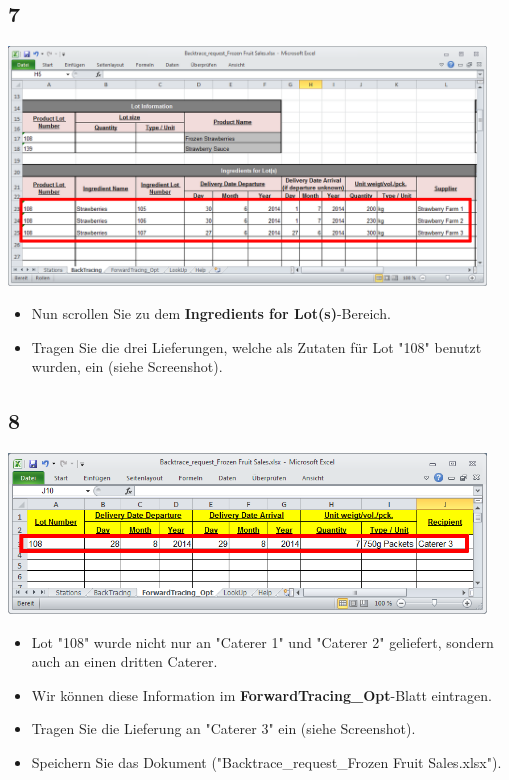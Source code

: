 \documentclass{beamer}
\begin{document}
\subsection{7}
\begin{frame}
	\begin{center}
  		\includegraphics[width=0.95\textwidth]{7.png}
	\end{center}
	\begin{itemize}
		\item Nun scrollen Sie zu dem \textbf{Ingredients for Lot(s)}-Bereich.
		\item Tragen Sie die drei Lieferungen, welche als Zutaten für Lot "108" benutzt wurden, ein (siehe Screenshot).
	\end{itemize}
\end{frame}

\subsection{8}
\begin{frame}
	\begin{center}
  		\includegraphics[width=0.95\textwidth]{8.png}
	\end{center}
	\begin{itemize}
		\item Lot "108" wurde nicht nur an "Caterer 1" und "Caterer 2" geliefert, sondern auch an einen dritten Caterer.
		\item Wir können diese Information im \textbf{ForwardTracing\_Opt}-Blatt eintragen.
		\item Tragen Sie die Lieferung an "Caterer 3" ein (siehe Screenshot).
		\item Speichern Sie das Dokument ("Backtrace\_request\_Frozen Fruit Sales.xlsx").
	\end{itemize}
\end{frame}
\end{document}
